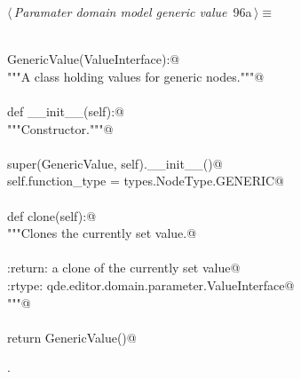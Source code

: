 \documentclass[
    a4paper,      %
    10pt,         %
    openright,    %
    notitlepage,  %
    parskip=half, %
]{scrreprt}       %
\theoremstyle{definition}                    %
\begin{document}
\begin{flushleft} \small
\begin{minipage}{\linewidth}\label{scrap153}\raggedright\small
{} $\langle\,${\itshape Paramater domain model generic value}\nobreak\ {\footnotesize {96a}}$\,\rangle\equiv$
\vspace{-1exm}
\begin{list}{}{} \item
\mbox{}\lstinline@@\\
\mbox{}\lstinline@class GenericValue(ValueInterface):@\\
\mbox{}\lstinline@    """A class holding values for generic nodes."""@\\
\mbox{}\lstinline@@\\
\mbox{}\lstinline@    def __init__(self):@\\
\mbox{}\lstinline@        """Constructor."""@\\
\mbox{}\lstinline@@\\
\mbox{}\lstinline@        super(GenericValue, self).__init__()@\\
\mbox{}\lstinline@        self.function_type = types.NodeType.GENERIC@\\
\mbox{}\lstinline@@\\
\mbox{}\lstinline@    def clone(self):@\\
\mbox{}\lstinline@        """Clones the currently set value.@\\
\mbox{}\lstinline@@\\
\mbox{}\lstinline@        :return: a clone of the currently set value@\\
\mbox{}\lstinline@        :rtype:  qde.editor.domain.parameter.ValueInterface@\\
\mbox{}\lstinline@        """@\\
\mbox{}\lstinline@@\\
\mbox{}\lstinline@        return GenericValue()@{\NWsep}
\end{list}
\vspace{-1.5ex}
\footnotesize
\begin{list}{}{\setlength{\itemsep}{-\parsep}\setlength{\itemindent}{-\leftmargin}}
\item {\NWtxtMacroNoRef}.

\item{}
\end{list}
\end{minipage}\vspace{4ex}
\end{flushleft}
\end{document}
